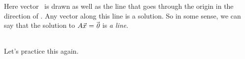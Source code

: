 {\begin{myfigure}%
\begin{center}
\end{center}
\label{fig:vect_sol_101}
\end{myfigure}

Here vector \vv\ is drawn as well as the line that goes through the origin in the direction of \vv. Any vector along this line is a solution. So in some sense, we can say that the solution to $A\vec{x_{}}=\vec{\text{\it 0}}$ is \textit{a line}. 
}\\

Let's practice this again. \\

